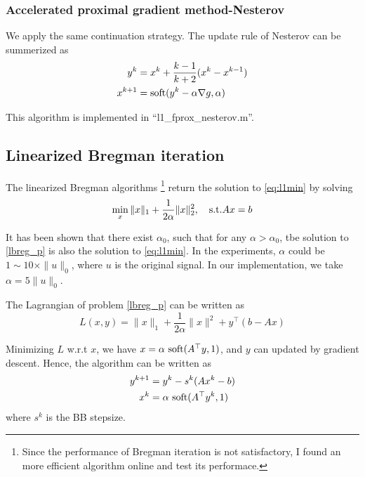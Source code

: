 \documentclass[conference,onecolumn,12pt]{IEEEtran}
\newcommand{\<}{\langle}
\renewcommand{\>}{\rangle}
\numberwithin{equation}{section}
\begin{document}

\subsubsection{Accelerated proximal gradient method-Nesterov}
\label{sec:Nes}
We apply the same continuation strategy. The update rule of Nesterov can be summerized as
\begin{subequations}
    \begin{align}
        y^k &= x^k+\frac{k-1}{k+2}(x^k-x^{k-1})\\
        x^{k+1} &= {\rm soft}(y^k-\alpha\nabla g, \alpha)        
    \end{align}
\end{subequations}

This algorithm is implemented in ``l1\_fprox\_nesterov.m''.



\subsection{Linearized Bregman iteration}
The linearized Bregman algorithms \cite{yuan2013linearized}\footnote{Since the performance of Bregman iteration is not satisfactory, I found an more efficient algorithm online and test its performace.} return the solution to \ref{eq:l1min} by solving
\begin{equation}
    \label{lbreg_p}
    \min_x \|x\|_1+\frac{1}{2\alpha}\|x\|_2^2,\quad {\rm s.t.} Ax=b
\end{equation}

It has been shown that there exist $\alpha_0$, such that for any $\alpha>\alpha_0$, tbe solution to \ref{lbreg_p} is also the solution to \ref{eq:l1min}. In the experiments, $\alpha$ could be $1\sim 10\times \|u\|_0$, where $u$ is the original signal. In our implementation, we take $\alpha = 5\|u\|_0$. 

The Lagrangian of problem \ref{lbreg_p} can be written as
\begin{equation}
    \label{lag_lbreg}
    L(x,y) = \|x\|_1+\frac{1}{2\alpha}\|x\|^2+y^\top (b-Ax)
\end{equation}

Minimizing $L$ w.r.t $x$, we have $x = \alpha {\ \rm soft}(A^\top y,1)$, and $y$ can updated by gradient descent. Hence, the algorithm can be written as
\begin{subequations}
    \begin{align}
        y^{k+1}&=y^k-s^k(Ax^k-b)\\
        x^k &= \alpha {\ \rm soft}(A^\top y^{k},1)
    \end{align}
\end{subequations}
where $s^k$ is the BB stepsize. 
\end{document}

